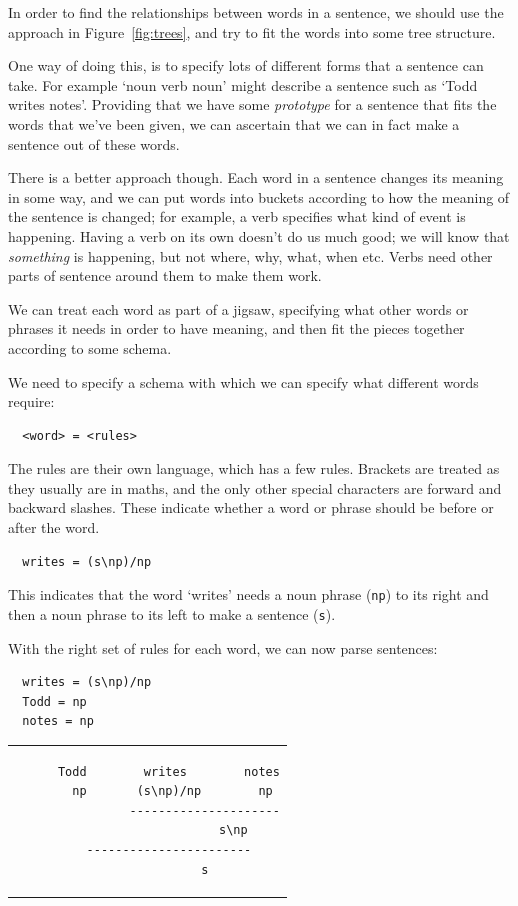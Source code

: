 In order to find the relationships between words in a sentence, we should use
the approach in Figure~\ref{fig:trees}, and try to fit the words into some tree
structure.

One way of doing this, is to specify lots of different forms that a sentence can
take. For example `noun verb noun' might describe a sentence such as `Todd
writes notes'. Providing that we have some \textit{prototype} for a sentence
that fits the words that we've been given, we can ascertain that we can in fact
make a sentence out of these words.

There is a better approach though. Each word in a sentence changes its meaning
in some way, and we can put words into buckets according to how the meaning of
the sentence is changed; for example, a verb specifies what kind of event is
happening. Having a verb on its own doesn't do us much good; we will know that
\textit{something} is happening, but not where, why, what, when etc. Verbs need
other parts of sentence around them to make them work.

We can treat each word as part of a jigsaw, specifying what other words or
phrases it needs in order to have meaning, and then fit the pieces together
according to some schema.

We need to specify a schema with which we can specify what different words require:

\begin{verbatim}
  <word> = <rules>
\end{verbatim}

The rules are their own language, which has a few rules. Brackets are
treated as they usually are in maths, and the only other special characters are
forward and backward slashes. These indicate whether a word or phrase should be
before or after the word.

\begin{verbatim}
  writes = (s\np)/np
\end{verbatim}

This indicates that the word `writes' needs a noun phrase (\texttt{np}) to its
right and then a noun phrase to its left to make a sentence (\texttt{s}).

With the right set of rules for each word, we can now parse sentences:

\begin{verbatim}
  writes = (s\np)/np
  Todd = np
  notes = np
\end{verbatim}

\begin{center}
  \begin{tabular}{c}
    \begin{lstlisting}
      Todd        writes        notes
       np       (s\np)/np        np
                ---------------------
                        s\np
      -----------------------
                s
    \end{lstlisting}
  \end{tabular}
\end{center}

